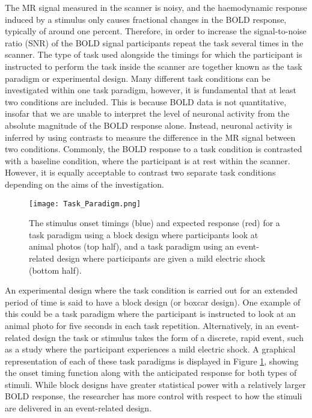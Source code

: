 The MR signal measured in the scanner is noisy, and the haemodynamic response induced by a stimulus only causes fractional changes in the BOLD response, typically of around one percent. Therefore, in order to increase the signal-to-noise ratio (SNR) of the BOLD signal participants repeat the task several times in the scanner. The type of task used alongside the timings for which the participant is instructed to perform the task inside the scanner are together known as the task paradigm or experimental design. Many different task conditions can be investigated within one task paradigm, however, it is fundamental that at least two conditions are included. This is because BOLD data is not quantitative, insofar that we are unable to interpret the level of neuronal activity from the absolute magnitude of the BOLD response alone. Instead, neuronal activity is inferred by using contrasts to measure the difference in the MR signal between two conditions. Commonly, the BOLD response to a task condition is contrasted with a baseline condition, where the participant is at rest within the scanner. However, it is equally acceptable to contrast two separate task conditions depending on the aims of the investigation. 

\begin{figure}[!ht] 
\centering
	\texttt{[image: Task\_Paradigm.png]}
\caption{The stimulus onset timings (blue) and expected response (red) for a task paradigm using a block design where participants look at animal photos (top half), and a task paradigm using an event-related design where participants are given a mild electric shock (bottom half).}
\label{fig:paradigm}
\end{figure}

An experimental design where the task condition is carried out for an extended period of time is said to have a block design (or boxcar design). One example of this could be a task paradigm where the participant is instructed to look at an animal photo for five seconds in each task repetition. Alternatively, in an event-related design the task or stimulus takes the form of a discrete, rapid event, such as a study where the participant experiences a mild electric shock. A graphical representation of each of these task paradigms is displayed in Figure \ref{fig:paradigm}, showing the onset timing function along with the anticipated response for both types of stimuli. While block designs have greater statistical power with a relatively larger BOLD response, the researcher has more control with respect to how the stimuli are delivered in an event-related design. 

